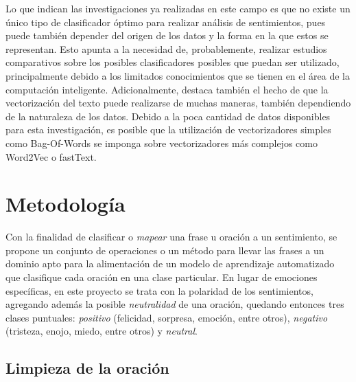 \documentclass[conference]{IEEEtran}
\begin{document}
    Lo que indican las investigaciones ya realizadas en este campo es que no existe un único tipo de clasificador óptimo para realizar análisis de sentimientos, pues puede también depender del origen de los datos y la forma en la que estos se representan. Esto apunta a la necesidad de, probablemente, realizar estudios comparativos sobre los posibles clasificadores posibles que puedan ser utilizado, principalmente debido a los limitados conocimientos que se tienen en el área de la computación inteligente. Adicionalmente, destaca también el hecho de que la vectorización del texto puede realizarse de muchas maneras, también dependiendo de la naturaleza de los datos. Debido a la poca cantidad de datos disponibles para esta investigación, es posible que la utilización de vectorizadores simples como Bag-Of-Words se imponga sobre vectorizadores más complejos como Word2Vec o fastText.
    



\section{Metodología} \label{sec:metodologia}

    Con la finalidad de clasificar o \textit{mapear} una frase u oración a un sentimiento, se propone un conjunto de operaciones o un método para llevar las frases a un dominio apto para la alimentación de un modelo de aprendizaje automatizado que clasifique cada oración en una clase particular. En lugar de emociones específicas, en este proyecto se trata con la polaridad de los sentimientos, agregando además la posible \textit{neutralidad} de una oración, quedando entonces tres clases puntuales: \textit{positivo} (felicidad, sorpresa, emoción, entre otros), \textit{negativo} (tristeza, enojo, miedo, entre otros) y \textit{neutral}.

    
    \subsection{Limpieza de la oración}
    
\end{document}
